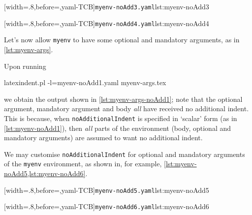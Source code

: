  \begin{minipage}{.45\textwidth}
  [width=.8\linewidth,before=\centering,yaml-TCB]{\texttt{myenv-noAdd3.yaml}}{lst:myenv-noAdd3}
 \end{minipage}
 \hfill
 \begin{minipage}{.45\textwidth}
  [width=.8\linewidth,before=\centering,yaml-TCB]{\texttt{myenv-noAdd4.yaml}}{lst:myenv-noAdd4}
 \end{minipage}


 Let's now allow \texttt{myenv} to have some optional and mandatory arguments, as in
 \cref{lst:myenv-args}.


 Upon running 
 \begin{commandshell}
latexindent.pl -l=myenv-noAdd1.yaml myenv-args.tex  
\end{commandshell}
 we obtain the output shown in \cref{lst:myenv-args-noAdd1}; note that the optional
 argument, mandatory argument and body \emph{all} have received no additional indent. This
 is because, when \texttt{noAdditionalIndent} is specified in `scalar' form (as in
 \cref{lst:myenv-noAdd1}), then \emph{all} parts of the environment (body, optional and
 mandatory arguments) are assumed to want no additional indent.

 We may customise \texttt{noAdditionalIndent} for optional and mandatory arguments of the
 \texttt{myenv} environment, as shown in, for example,
 \cref{lst:myenv-noAdd5,lst:myenv-noAdd6}.

 \begin{minipage}{.49\textwidth}
  [width=.8\linewidth,before=\centering,yaml-TCB]{\texttt{myenv-noAdd5.yaml}}{lst:myenv-noAdd5}
 \end{minipage}
 \hfill
 \begin{minipage}{.49\textwidth}
  [width=.8\linewidth,before=\centering,yaml-TCB]{\texttt{myenv-noAdd6.yaml}}{lst:myenv-noAdd6}
 \end{minipage}

